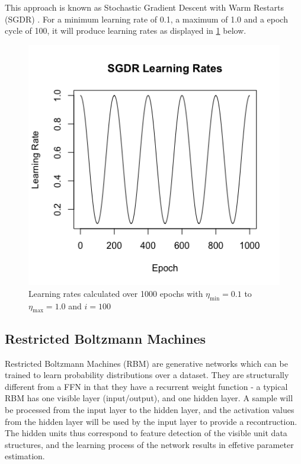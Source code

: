 \documentclass[a4paper,11pt,oneside]{article}
\theoremstyle{plain}
\theoremstyle{definition}
\begin{document}
This approach is known as Stochastic Gradient Descent with Warm Restarts (SGDR) \cite{Loshchilov}. For a minimum learning rate of 0.1, a maximum of 1.0 and a epoch cycle of 100, it will produce learning rates as displayed in \ref{figure-SGDRLearningRates} below.

\begin{figure}[H]
	\centering \includegraphics[scale=0.5]{images/implementation/SGDRLearningRates.png}
	\caption{Learning rates calculated over 1000 epochs with $\eta_{\min} = 0.1$ to $\eta_{\max} = 1.0$ and $i=100$}
	\label{figure-SGDRLearningRates}
\end{figure}		

\subsection{Restricted Boltzmann Machines}\label{imp_rbm}

Restricted Boltzmann Machines (RBM) are generative networks which can be trained to learn probability distributions over a dataset. They are structurally different from a FFN in that they have a recurrent weight function - a typical RBM has one visible layer (input/output), and one hidden layer. A sample will be processed from the input layer to the hidden layer, and the activation values from the hidden layer will be used by the input layer to provide a recontruction. The hidden units thus correspond to feature detection of the visible unit data structures, and the learning process of the network results in effetive parameter estimation. 
\end{document}
